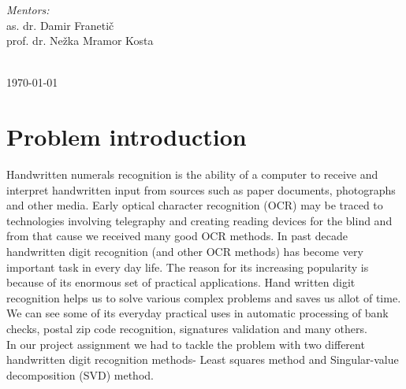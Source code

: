 \documentclass[12pt]{article}
\begin{document}
\begin{titlepage}
\begin{minipage}{0.5\textwidth}
\begin{flushleft} \large
	\emph{Mentors:}\\
	as. dr. Damir Franetič\\ %
	prof. dr. Nežka Mramor Kosta \vspace{0.7 cm}\\ %
\end{flushleft}


\end{minipage}\\[2cm]


{\large \today}\\[2cm] %

\vfill %

\end{titlepage}

\tableofcontents
\newpage
\listoffigures
\newpage

\section{Problem introduction}
Handwritten numerals recognition  is the ability of a computer to receive and interpret handwritten input from sources such as paper documents, photographs and other media. Early optical character recognition (OCR) may be traced to technologies involving telegraphy and creating reading devices for the blind and from that cause we received many good OCR methods. In past decade handwritten digit recognition (and other OCR methods) has become very important task in every day life. The reason for its increasing popularity is because of its enormous set of practical applications. Hand written digit recognition helps us to solve various complex problems and saves us allot of time. We can see some of its everyday practical uses in automatic processing of bank checks, postal zip code recognition, signatures validation and many others.\\
\newline
In our project assignment we had to tackle the problem with two different handwritten digit recognition methods- Least squares method and Singular-value decomposition (SVD) method.
\end{document}
